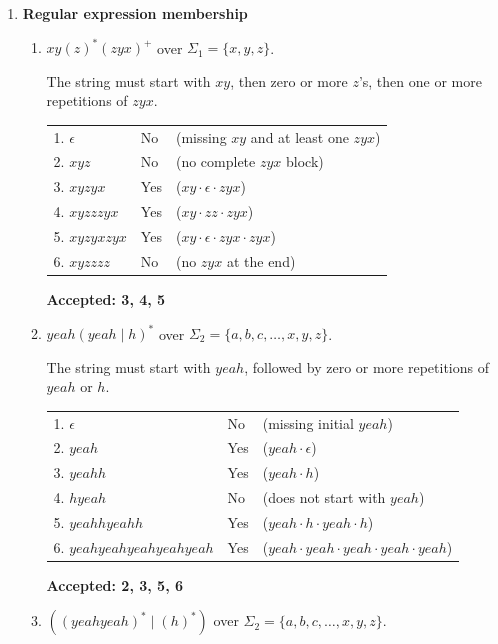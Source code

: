 \documentclass[11pt]{article}
\begin{document}
\begin{enumerate}

\item \textbf{Regular expression membership}

\begin{enumerate}

\item $xy(z)^*(zyx)^+$ over $\Sigma_1 = \{x, y, z\}$.

The string must start with $xy$, then zero or more $z$'s, then one or more repetitions of $zyx$.

\begin{tabular}{lll}
1. $\epsilon$ & No & (missing $xy$ and at least one $zyx$) \\
2. $xyz$ & No & (no complete $zyx$ block) \\
3. $xyzyx$ & Yes & ($xy \cdot \epsilon \cdot zyx$) \\
4. $xyzzzyx$ & Yes & ($xy \cdot zz \cdot zyx$) \\
5. $xyzyxzyx$ & Yes & ($xy \cdot \epsilon \cdot zyx \cdot zyx$) \\
6. $xyzzzz$ & No & (no $zyx$ at the end) \\
\end{tabular}

\textbf{Accepted: 3, 4, 5}

\item $yeah(yeah \mid h)^*$ over $\Sigma_2 = \{a, b, c, \ldots, x, y, z\}$.

The string must start with $yeah$, followed by zero or more repetitions of $yeah$ or $h$.

\begin{tabular}{lll}
1. $\epsilon$ & No & (missing initial $yeah$) \\
2. $yeah$ & Yes & ($yeah \cdot \epsilon$) \\
3. $yeahh$ & Yes & ($yeah \cdot h$) \\
4. $hyeah$ & No & (does not start with $yeah$) \\
5. $yeahhyeahh$ & Yes & ($yeah \cdot h \cdot yeah \cdot h$) \\
6. $yeahyeahyeahyeahyeah$ & Yes & ($yeah \cdot yeah \cdot yeah \cdot yeah \cdot yeah$) \\
\end{tabular}

\textbf{Accepted: 2, 3, 5, 6}

\item $((yeahyeah)^* \mid (h)^*)$ over $\Sigma_2 = \{a, b, c, \ldots, x, y, z\}$.


\end{enumerate}
\end{enumerate}
\end{document}
